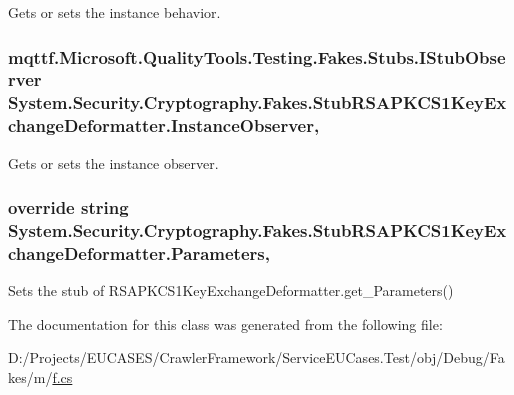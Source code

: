 Gets or sets the instance behavior.

\hypertarget{class_system_1_1_security_1_1_cryptography_1_1_fakes_1_1_stub_r_s_a_p_k_c_s1_key_exchange_deformatter_a885f9414f8a55c71180b6dd2ed5516e3}{
\subsubsection[{Instance\-Observer}]{\setlength{\rightskip}{0pt plus 5cm}mqttf.\-Microsoft.\-Quality\-Tools.\-Testing.\-Fakes.\-Stubs.\-I\-Stub\-Observer System.\-Security.\-Cryptography.\-Fakes.\-Stub\-R\-S\-A\-P\-K\-C\-S1\-Key\-Exchange\-Deformatter.\-Instance\-Observer\hspace{0.3cm}{\ttfamily [get]}, {\ttfamily [set]}}}\label{class_system_1_1_security_1_1_cryptography_1_1_fakes_1_1_stub_r_s_a_p_k_c_s1_key_exchange_deformatter_a885f9414f8a55c71180b6dd2ed5516e3}


Gets or sets the instance observer.

\hypertarget{class_system_1_1_security_1_1_cryptography_1_1_fakes_1_1_stub_r_s_a_p_k_c_s1_key_exchange_deformatter_a73e9a896bd15c7f421ccfe99330f1323}{
\subsubsection[{Parameters}]{\setlength{\rightskip}{0pt plus 5cm}override string System.\-Security.\-Cryptography.\-Fakes.\-Stub\-R\-S\-A\-P\-K\-C\-S1\-Key\-Exchange\-Deformatter.\-Parameters\hspace{0.3cm}{\ttfamily [get]}, {\ttfamily [set]}}}\label{class_system_1_1_security_1_1_cryptography_1_1_fakes_1_1_stub_r_s_a_p_k_c_s1_key_exchange_deformatter_a73e9a896bd15c7f421ccfe99330f1323}


Sets the stub of R\-S\-A\-P\-K\-C\-S1\-Key\-Exchange\-Deformatter.\-get\-\_\-\-Parameters()



The documentation for this class was generated from the following file\-:\begin{DoxyCompactItemize}
\item 
D\-:/\-Projects/\-E\-U\-C\-A\-S\-E\-S/\-Crawler\-Framework/\-Service\-E\-U\-Cases.\-Test/obj/\-Debug/\-Fakes/m/\hyperlink{m_2f_8cs}{f.\-cs}\end{DoxyCompactItemize}
